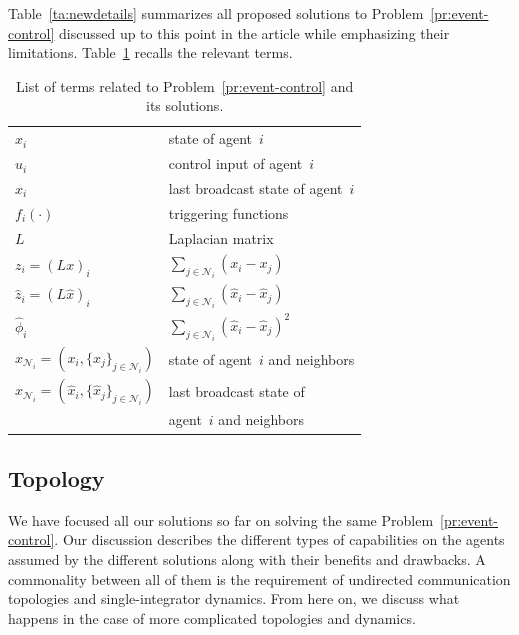 \documentclass{autart}
\newcommand{\NN}{{\mathcal{N}}}
\renewcommand{\hat}{\widehat}
\begin{document}
Table~\ref{ta:newdetails} summarizes all proposed solutions to
Problem~\ref{pr:event-control} discussed up to this point in the
article while emphasizing their limitations. Table~\ref{ta:taxonomy} 
recalls the relevant terms.
 

\renewcommand{\arraystretch}{1.3}
\begin{table}[htb!]
  {
  \begin{center}
    \begin{tabular}{|ll|}
      \hline
      $x_i$ & state of agent~$i$ 
      \\
      $u_i$ & control input of agent~$i$ 
      \\
      $\hat{x}_i$ & last broadcast state of agent~$i$ 
      \\
      $f_i(\cdot)$ & triggering functions
      \\
      $L$ & Laplacian matrix 
      \\
      $z_i = (Lx)_i$ & $\sum_{j \in \NN_i} (x_i - x_j)$ 
      \\
      $\hat{z}_i = (L\hat{x})_i$ & $\sum_{j \in \NN_i} (\hat{x}_i -
      \hat{x}_j)$ 
      \\
      $\hat{\phi}_i$ & $\sum_{j \in \NN_i} (\hat{x}_i - \hat{x}_j)^2$ 
      \\
      $x_{\NN_i} = (x_i,\{ x_j \}_{j \in \NN_i})$ & state of
 agent~$i$ and neighbors
      \\
      $\hat{x}_{\NN_i} = (\hat{x}_i, \{ \hat{x}_j \}_{j \in \NN_i})
$ & last broadcast state of 
      \\ 
      & \; agent~$i$ and neighbors
      \\
      \hline
    \end{tabular}
  \end{center}
  \caption{List of terms related to Problem~\ref{pr:event-control}
    and its solutions.}\label{ta:taxonomy} 
}
\end{table}


\subsection{\textbf{Topology}}\label{se:topology}

{We have focused all our solutions so far on solving the same
  Problem~\ref{pr:event-control}.  Our discussion describes the
  different types of capabilities on the agents assumed by the
  different solutions along with their benefits and drawbacks. A
  commonality between all of them is the requirement of undirected
  communication topologies and single-integrator dynamics. From here
  on, we discuss what happens in the case of more complicated
  topologies and dynamics.}
\end{document}
